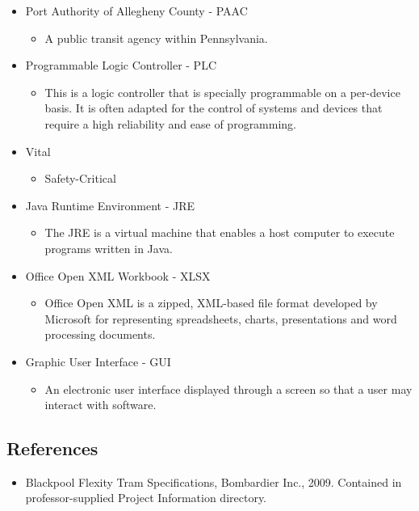 \documentclass{article}
\begin{document}
\begin{itemize}
        \item Port Authority of Allegheny County - PAAC
            \begin{itemize}
            \item A public transit agency within Pennsylvania.
            \end{itemize}    
        \item Programmable Logic Controller - PLC 
            \begin{itemize}
            \item This is a logic controller that is specially programmable on a per-device basis. It is often adapted for the control of systems and devices that require a high reliability and ease of programming.
            \end{itemize}
        \item Vital
            \begin{itemize}
            \item Safety-Critical
            \end{itemize}
        \item Java Runtime Environment - JRE
            \begin{itemize}
            \item  The JRE is a virtual machine that enables a host computer to execute programs written in Java.
            \end{itemize}
        \item Office Open XML Workbook - XLSX
            \begin{itemize}
            \item  Office Open XML is a zipped, XML-based file format developed by Microsoft for representing spreadsheets, charts, presentations and word processing documents.
            \end{itemize}
        \item Graphic User Interface - GUI
            \begin{itemize}
                \item An electronic user interface  displayed through a screen so that a user may interact with software.
            \end{itemize}
    \end{itemize}
    
    \subsection{References}
     \begin{itemize}
        \item Blackpool Flexity Tram Specifications, Bombardier Inc., 2009. Contained in professor-supplied Project Information directory.
    \end{itemize}
\end{document}
